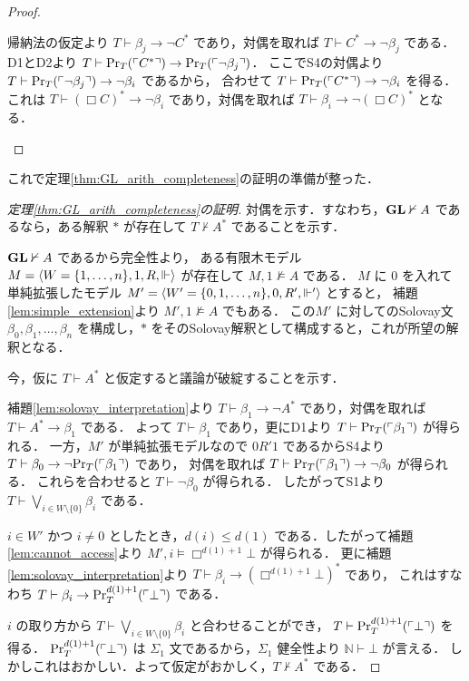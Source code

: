 \documentclass{jlreq}
\begin{document}
\begin{proof}
\begin{itemize}
\begin{enumerate}
			            帰納法の仮定より $T \vdash \beta_j \to \lnot C^*$ であり，対偶を取れば $T \vdash C^* \to \lnot \beta_j$ である．
			            D1とD2より $T \vdash \mathrm{Pr}_T(\ulcorner C^* \urcorner) \to \mathrm{Pr}_T(\ulcorner \lnot \beta_j \urcorner)$．
			            ここでS4の対偶より $T \vdash \mathrm{Pr}_T(\ulcorner \lnot \beta_j \urcorner) \to \lnot \beta_i$ であるから，
			            合わせて $T \vdash \mathrm{Pr}_T(\ulcorner C^* \urcorner) \to \lnot \beta_i$ を得る．
			            これは $T \vdash (\Box C)^* \to \lnot \beta_i$ であり，対偶を取れば $T \vdash \beta_i \to \lnot (\Box C)^*$ となる．
		      \end{enumerate}
	\end{itemize}
\end{proof}

これで定理\ref{thm:GL_arith_completeness}の証明の準備が整った．

\begin{proof}[定理\ref{thm:GL_arith_completeness}の証明]
	対偶を示す．すなわち，$\mathbf{GL} \nvdash A$ であるなら，ある解釈 $*$ が存在して $T \nvdash A^*$ であることを示す．

	$\mathbf{GL} \nvdash A$ であるから完全性より，
	ある有限木モデル $M = \langle W = \{1, \dots, n\}, 1, R, \Vdash \rangle$ が存在して $M,1 \nvDash A$ である．
	$M$ に $0$ を入れて単純拡張したモデル $M' = \langle W'=\{0,1,\dots,n\},0, R', \Vdash' \rangle$ とすると，
	補題\ref{lem:simple_extension}より $M',1 \nvDash A$ でもある．
	この$M'$ に対してのSolovay文 $\beta_0, \beta_1, \dots, \beta_n$ を構成し，$*$ をそのSolovay解釈として構成すると，これが所望の解釈となる．

	今，仮に $T \vdash A^*$ と仮定すると議論が破綻することを示す．

	補題\ref{lem:solovay_interpretation}より $T \vdash \beta_1 \to \lnot A^*$ であり，対偶を取れば $T \vdash A^* \to \beta_1$ である．
	よって $T \vdash \beta_1$ であり，更にD1より $T \vdash \mathrm{Pr}_T(\ulcorner \beta_1 \urcorner)$ が得られる．
	一方，$M'$ が単純拡張モデルなので $0 R' 1$ であるからS4より $T \vdash \beta_0 \to \lnot \mathrm{Pr}_T(\ulcorner \beta_1 \urcorner)$ であり，
	対偶を取れば $T \vdash \mathrm{Pr}_T(\ulcorner \beta_1 \urcorner) \to \lnot \beta_0$ が得られる．
	これらを合わせると $T \vdash \lnot \beta_0$ が得られる．
	したがってS1より $T \vdash \bigvee_{i \in W \setminus \{0\}} \beta_i$ である．

	$i \in W'$ かつ $i \neq 0$ としたとき，$d(i) \leq d(1)$ である．したがって補題\ref{lem:cannot_access}より
	$M',i \vDash \Box^{d(1) + 1} \bot$ が得られる．
	更に補題\ref{lem:solovay_interpretation}より $T \vdash \beta_i \to (\Box^{d(1) + 1} \bot)^*$ であり，
	これはすなわち $T \vdash \beta_{i} \to \mathrm{Pr}^{d(1) + 1}_T(\ulcorner \bot \urcorner)$ である．

	$i$ の取り方から $T \vdash \bigvee_{i \in W \setminus \{0\}} \beta_i$ と合わせることができ，
	$T \vdash \mathrm{Pr}^{d(1) + 1}_T(\ulcorner \bot \urcorner)$ を得る．
	$\mathrm{Pr}^{d(1) + 1}_T(\ulcorner \bot \urcorner)$ は $\Sigma_1$ 文であるから，$\Sigma_1$ 健全性より $\mathbb{N} \vdash \bot$ が言える．
	しかしこれはおかしい．よって仮定がおかしく，$T \nvdash A^*$ である．

\end{proof}
\end{document}
